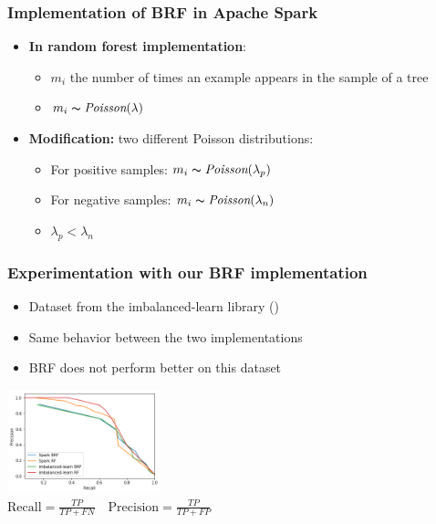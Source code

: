 \documentclass[slidestop,compress,red,mathserif]{beamer}
\newcommand{\colorcite}[1]{\colorlet{saved}{.}\color{sangria}\cite{#1}\color{saved}}
\begin{document}
\begin{frame}
\frametitle{Implementation of BRF in Apache Spark}
\begin{itemize}
    \vfill
    \item[] \textbf{In random forest implementation}: 
        \begin{itemize}
            \item $m_i$ the number of times an example appears in the sample of a tree
            \item $m_i \thicksim \textit{Poisson}(\lambda)$
        \end{itemize}
    \item[] \textbf{Modification:} two different Poisson distributions:
        \begin{itemize}
            \item For positive samples: $m_i \thicksim \textit{Poisson}(\lambda_p)$
            \item For negative samples: $m_i \thicksim \textit{Poisson}(\lambda_n)$
            \item $\lambda_p < \lambda_n$
        \end{itemize}
    \vfill
\end{itemize}
\end{frame}

\begin{frame}
\frametitle{Experimentation with our BRF implementation}
\begin{itemize}
  \item Dataset from the imbalanced-learn library (\colorcite{Woods1993})
  \item Same behavior between the two implementations
  \item BRF does not perform better on this dataset
\end{itemize}

\centering
\includegraphics[height=3.0cm, keepaspectratio]{Figures/test_brf_pr.png}\\
$\mathrm{Recall} = \frac{TP}{TP+FN} \quad  \mathrm{Precision} = \frac{TP}{TP+FP}$

\end{frame}

\end{document}
